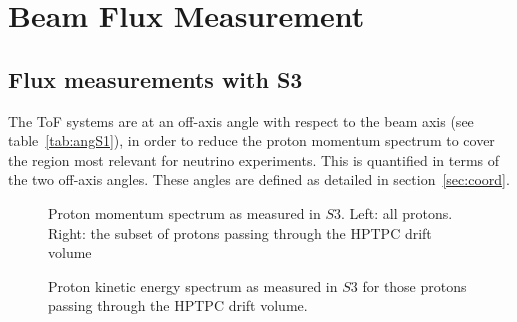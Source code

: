 \section{Beam Flux Measurement}
\label{hptpcPaper:sec:Results}

\subsection{Flux measurements with S3}

The ToF systems are at an off-axis angle with respect to the beam axis (see table~\ref{tab:angS1}), in order to reduce the proton momentum spectrum to cover the region most relevant for neutrino experiments.
This is quantified in terms of the two off-axis angles.
These angles are defined as detailed in section~\ref{sec:coord}.

\begin{figure}[ht]
  \centering
  \begin{minipage}[t]{0.49\textwidth}
    \begin{adjustbox}{max totalsize={\textwidth}, center}
      
    \end{adjustbox}
  \end{minipage}
  \hfill
  \begin{minipage}[t]{0.49\textwidth}
    \begin{adjustbox}{max totalsize={\textwidth}, center}
      
    \end{adjustbox}
  \end{minipage}
  \caption{\label{fig:s3promom}Proton momentum spectrum as measured in $\mathit{S3}$. Left: all protons. Right: the subset of protons passing through the HPTPC drift volume}
\end{figure}

\begin{figure}[ht]
  \centering
  \begin{adjustbox}{max totalsize={0.5\textwidth}, center}
      
  \end{adjustbox}
  \caption{Proton kinetic energy spectrum as measured in $\mathit{S3}$ for those protons passing through the HPTPC drift volume.}
  \label{fig:tpcproke}
\end{figure}

